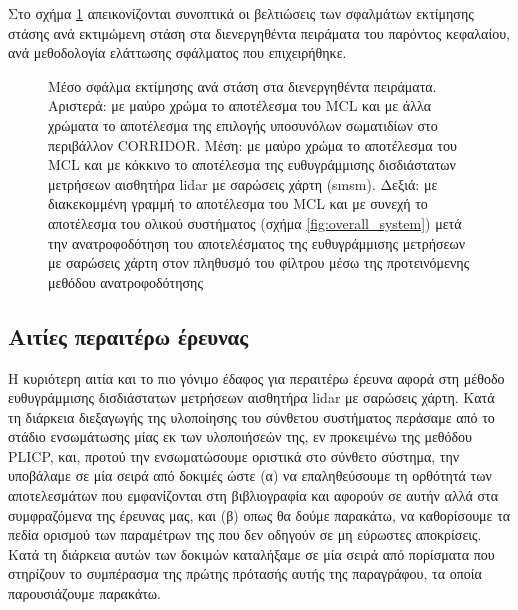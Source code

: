 Στο σχήμα \ref{fig:02_02_05:01} απεικονίζονται συνοπτικά οι βελτιώσεις των
σφαλμάτων εκτίμησης στάσης ανά εκτιμώμενη στάση στα διενεργηθέντα πειράματα
του παρόντος κεφαλαίου, ανά μεθοδολογία ελάττωσης σφάλματος που επιχειρήθηκε.

\begin{figure}[h]
  \vspace{1.5cm}
  \hspace{-1.5cm}
  
  \vspace{1cm}
  \caption{\small Μέσο σφάλμα εκτίμησης ανά στάση στα διενεργηθέντα πειράματα.
           Αριστερά: με μαύρο χρώμα το αποτέλεσμα του MCL και με άλλα χρώματα
           το αποτέλεσμα της επιλογής υποσυνόλων σωματιδίων στο περιβάλλον
           CORRIDOR. Μέση: με μαύρο χρώμα το αποτέλεσμα του MCL και με κόκκινο
           το αποτέλεσμα της ευθυγράμμισης δισδιάστατων μετρήσεων αισθητήρα
           lidar με σαρώσεις χάρτη (smsm). Δεξιά: με διακεκομμένη γραμμή το
           αποτέλεσμα του MCL και με συνεχή το αποτέλεσμα του ολικού συστήματος
           (σχήμα \ref{fig:overall_system}) μετά την ανατροφοδότηση του
           αποτελέσματος της ευθυγράμμισης μετρήσεων με σαρώσεις χάρτη στον
           πληθυσμό του φίλτρου μέσω της προτεινόμενης μεθόδου ανατροφοδότησης}
  \label{fig:02_02_05:01}
\end{figure}


\subsection{Αιτίες περαιτέρω έρευνας}
\label{subsection:02_02_05:02}

Η κυριότερη αιτία και το πιο γόνιμο έδαφος για περαιτέρω έρευνα αφορά στη
μέθοδο ευθυγράμμισης δισδιάστατων μετρήσεων αισθητήρα lidar με σαρώσεις χάρτη.
Κατά τη διάρκεια διεξαγωγής της υλοποίησης του σύνθετου συστήματος περάσαμε από
το στάδιο ενσωμάτωσης μίας εκ των υλοποιήσεών της, εν προκειμένω της μεθόδου
PLICP, και, προτού την ενσωματώσουμε οριστικά στο σύνθετο σύστημα, την
υποβάλαμε σε μία σειρά από δοκιμές ώστε (α) να επαληθεύσουμε τη ορθότητά των
αποτελεσμάτων που εμφανίζονται στη βιβλιογραφία και αφορούν σε αυτήν αλλά στα
συμφραζόμενα της έρευνας μας, και (β) οπως θα δούμε παρακάτω, να καθορίσουμε τα
πεδία ορισμού των παραμέτρων της που δεν οδηγούν σε μη εύρωστες αποκρίσεις.
Κατά τη διάρκεια αυτών των δοκιμών καταλήξαμε σε μία σειρά από πορίσματα που
στηρίζουν το συμπέρασμα της πρώτης πρότασής αυτής της παραγράφου, τα οποία
παρουσιάζουμε παρακάτω.

